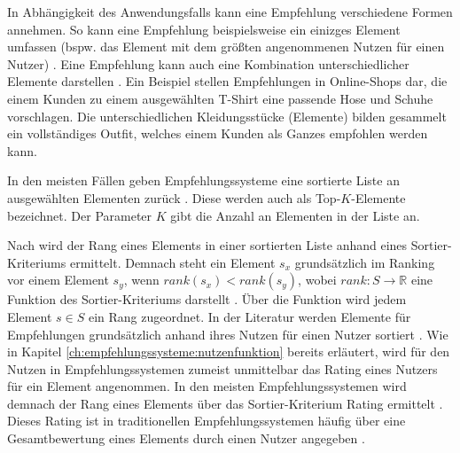 In Abhängigkeit des Anwendungsfalls kann eine Empfehlung verschiedene Formen annehmen.
So kann eine Empfehlung beispielsweise ein einizges Element umfassen (bspw. das Element mit dem größten angenommenen Nutzen für einen Nutzer) \cite[S. 6]{ricci:inbook}.
Eine Empfehlung kann auch eine Kombination unterschiedlicher Elemente darstellen \cite[S. 7]{ricci:inbook}.
Ein Beispiel stellen Empfehlungen in Online-Shops dar, die einem Kunden zu einem ausgewählten T-Shirt eine passende Hose und Schuhe vorschlagen.
Die unterschiedlichen Kleidungsstücke (Elemente) bilden gesammelt ein vollständiges Outfit, welches einem Kunden als Ganzes empfohlen werden kann.

In den meisten Fällen geben Empfehlungssysteme eine sortierte Liste an ausgewählten Elementen zurück \cite[S. 3]{recommenderSystems:2016}\cite[S. 141]{ekstrand:article}.
Diese werden auch als Top-$K$-Elemente bezeichnet.
Der Parameter $K$ gibt die Anzahl an Elementen in der Liste an.

Nach \textcite[S. 900]{adomavicius:article} wird der Rang eines Elements in einer sortierten Liste anhand eines Sortier-Kriteriums ermittelt.
Demnach steht ein Element $s_{x}$ grundsätzlich im Ranking vor einem Element $s_{y}$, wenn $rank(s_{x})<rank(s_{y})$, wobei $rank: S \rightarrow \mathbb{R}$ eine Funktion des Sortier-Kriteri\-ums darstellt \cite[S. 900]{adomavicius:article}.
Über die Funktion wird jedem Element $s \in S$ ein Rang zugeordnet.
In der Literatur werden Elemente für Empfehlungen grundsätzlich anhand ihres Nutzen für einen Nutzer sortiert \cite[S. 735]{adomavicius:inproceedings}\cite[S. 10f.]{ricci:inbook}.
Wie in Kapitel \ref{ch:empfehlungssysteme:nutzenfunktion} bereits erläutert, wird für den Nutzen in Empfehlungssystemen zumeist unmittelbar das Rating eines Nutzers für ein Element angenommen.
In den meisten Empfehlungssystemen wird demnach der Rang eines Elements über das Sortier-Kriterium Rating ermittelt \cite[S. 900]{adomavicius:article}.
Dieses Rating ist in traditionellen Empfehlungssystemen häufig über eine Gesamtbewertung eines Elements durch einen Nutzer angegeben \cite[S. 219]{lakiotaki:inproceedings}.

